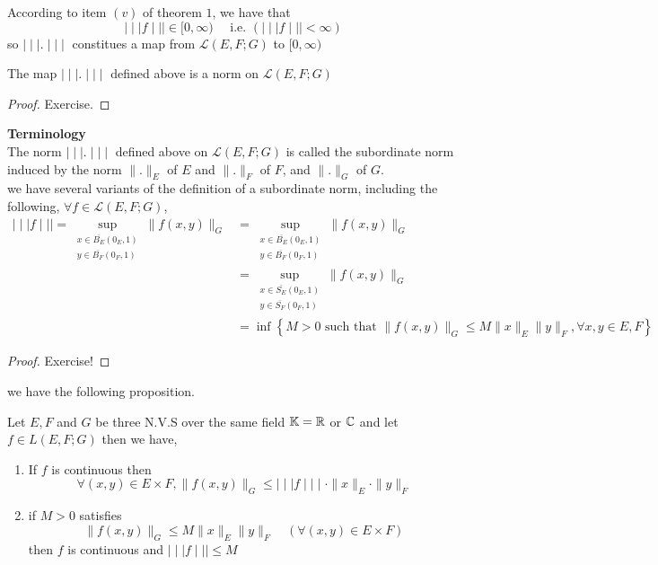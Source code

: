 According to item $(v)$ of theorem $1 $, we have that 
\[
	\mid \mid \mid  f \mid \mid \mid \in  [0, \infty) \quad 
	\text{ i.e. } ( \mid \mid \mid  f \mid \mid \mid <  \infty )   
\]
so $\mid \mid \mid  . \mid \mid \mid  $  constitues a map from 
$\mathcal{L} (E,F; G)  $  to $[0,\infty)$  
\begin{theorem}[]
	The map $\mid \mid \mid  . \mid \mid \mid  $  defined above is a norm on 
	$\mathcal{L} (E,F;G)$ 
\end{theorem}
\begin{proof}
Exercise.
\end{proof}
\textbf{Terminology }  \\
The norm $\mid \mid \mid  .  \mid \mid \mid  $  defined above on 
$\mathcal{L} (E,F;G)  $ is called the subordinate norm induced by the norm
$\| . \| _{E} $  of $E $ and $\| . \| _{F} $  of $F$, and 
$\| . \|_{G}  $  of $G$. \\
we have several variants of the definition of a subordinate norm, 
including the following, $\forall f \in  \mathcal{L} (E,F;G)$,  
\begin{align*}
	\mid \mid \mid  f \mid \mid \mid = 
	\sup_{
		\begin{gathered}  
	x \in  \overline{B_{E}}(0_{E},1)
			\\ 
	y \in \overline{B_{F}}(0_{F},1) 
		\end{gathered}
} 
\| f(x,y)  \| _{G} 
&=  
	\sup_{
		\begin{gathered}  
	x \in  \overline{B_{E}}(0_{E},1)
			\\ 
	y \in \overline{B_{F}}(0_{F},1) 
		\end{gathered}
} 
\| f(x,y)  \| _{G} 
  \\
&= 
	\sup_{
		\begin{gathered}  
	x \in  \overline{S_{E}}(0_{E},1)
			\\ 
	y \in \overline{S_{F}}(0_{F},1) 
		\end{gathered}
} 
\| f(x,y)  \| _{G}  
\\ &=
\inf_{}  
\left\{ 
	M > 0 \text{ such that } 
	\| f(x,y)  \| _{G} \leq M \| x \| _{E} \| y \| _{F}, 
	 \forall x,y \in  E,F
\right\}
\end{align*}
\begin{proof}
Exercise!
\end{proof}
we have the following proposition.
\begin{theorem}[]
	Let $E,F $ and $G $ be three N.V.S over the same field $\mathbb{K} = \mathbb{R}  $ 
	or $\mathbb{C} $ and let $f \in  L(E,F;G)  $  then we have, 
	\begin{enumerate}[(1)]
	\item  If $f $ is continuous then 
		\[
		\forall (x,y) \in  E \times F , 
		 \| f(x,y)  \| _{G} \leq 
		 \mid \mid \mid  f \mid \mid \mid   \cdot 
		 \| x \| _{E} \cdot \| y \| _{F}
		\]
	\item if $M > 0 $ satisfies 
		\[
		\| f(x,y)  \| _{G} \leq 
		M \| x \| _{E} \| y \| _{F} \quad 
		(\forall (x,y) \in  E \times F ) 
		\]
	then $f $ is continuous and $\mid \mid \mid  f \mid \mid \mid \leq M $ 
	\end{enumerate}
\end{theorem}

